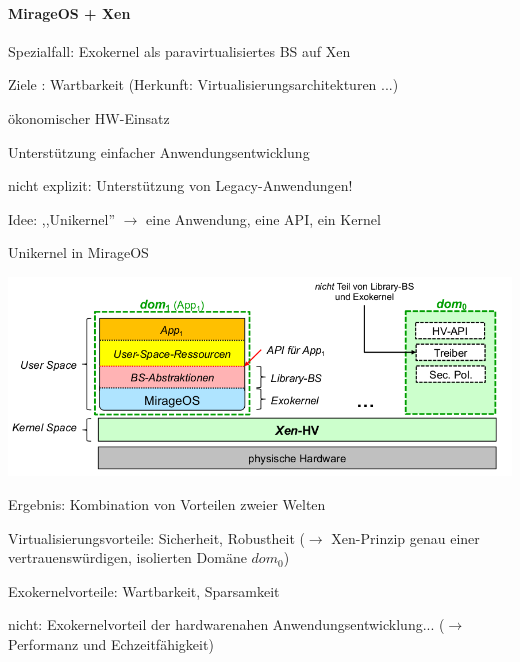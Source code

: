 \documentclass[a4paper]{article}
\begin{document}
\begin{multicols}{3}
    \paragraph{MirageOS + Xen}
    \begin{itemize*}
        \item Spezialfall: Exokernel als paravirtualisiertes BS auf Xen
        \item Ziele : Wartbarkeit (Herkunft: Virtualisierungsarchitekturen ...)
        \begin{itemize*}
            \item ökonomischer HW-Einsatz
            \item Unterstützung einfacher Anwendungsentwicklung
            \item nicht explizit: Unterstützung von Legacy-Anwendungen!
        \end{itemize*}
        \item Idee: ,,Unikernel'' $\rightarrow$ eine Anwendung, eine
        API, ein Kernel
        \item Unikernel in MirageOS
        \item \includegraphics[width=.8\linewidth]{Assets/AdvancedOperatingSystems-mirageOs-architektur.png}
        \item Ergebnis: Kombination von Vorteilen zweier Welten
        \item Virtualisierungsvorteile: Sicherheit, Robustheit ($\rightarrow$ Xen-Prinzip genau einer vertrauenswürdigen, isolierten Domäne $dom_0$)
        \item Exokernelvorteile: Wartbarkeit, Sparsamkeit
        \item nicht: Exokernelvorteil der hardwarenahen Anwendungsentwicklung... ($\rightarrow$ Performanz und Echzeitfähigkeit)
    \end{itemize*}


\end{multicols}
\end{document}
